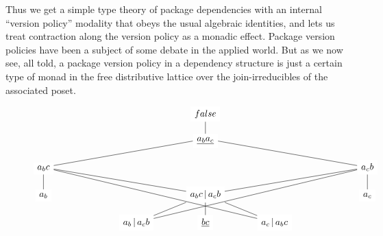 \documentclass[hoptionsi,review,screen,format=acmsmall]{acmart}
\theoremstyle{definition}
\newcommand{\bor}{\mathop{|}}
\begin{document}
Thus we get a simple type theory of package dependencies with an internal ``version policy'' modality that obeys the usual algebraic identities, and lets us treat contraction along the version policy as a monadic effect. Package version policies have been a subject of some debate in the applied world. But as we now see, all told, a package version policy in a dependency structure is just a certain type of monad in the free distributive lattice over the join-irreducibles of the associated poset.


\begin{figure}
\begin{equation*}
\begin{tikzcd}[row sep=scriptsize, column sep=large,cells={nodes={fill=white,fill opacity=1}}]
                            &  &                                                                          & false                                                                                              &                                                                          &  &                             \\
                            &  &                                                                          & \underline{a_b a_c} \arrow[u, no head]                                                                         &                                                                          &  &                             \\
a_b c \arrow[rrru, no head] &  &                                                                          &                                                                                                    &                                                                          &  & a_c b \arrow[lllu, no head] \\
a_b \arrow[u, no head]      &  &                                                                          & a_b c \bor a_c b \arrow[lllu, no head] \arrow[rrru, no head]                                       &                                                                          &  & a_c \arrow[u, no head]      \\
                            &  & a_b \bor a_c b \arrow[ru, no head] \arrow[rrrruu, no head]               & \underline{bc} \arrow[u, no head]                                                                              & a_c \bor a_b c \arrow[lu, no head] \arrow[lllluu, no head]               &  &                             \\[10pt]

\end{tikzcd}
\end{equation*}
\end{figure}
\end{document}
